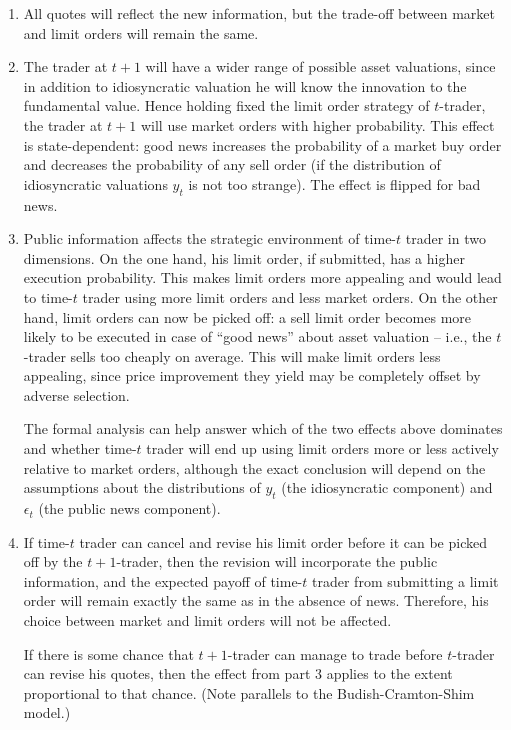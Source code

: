 \begin{solution}
	\begin{enumerate}
		\item All quotes will reflect the new information, but the trade-off between market and limit orders will remain the same.
		
		\item The trader at $t+1$ will have a wider range of possible asset valuations, since in addition to idiosyncratic valuation he will know the innovation to the fundamental value. Hence holding fixed the limit order strategy of $t$-trader, the trader at $t+1$ will use market orders with higher probability. This effect is state-dependent: good news increases the probability of a market buy order and decreases the probability of any sell order (if the distribution of idiosyncratic valuations $y_t$ is not too strange). The effect is flipped for bad news.
		
		\item Public information affects the strategic environment of time-$t$ trader in two dimensions. On the one hand, his limit order, if submitted, has a higher execution probability. This makes limit orders more appealing and would lead to time-$t$ trader using more limit orders and less market orders. On the other hand, limit orders can now be picked off: a sell limit order becomes more likely to be executed in case of ``good news'' about asset valuation -- i.e., the $t$-trader sells too cheaply on average. This will make limit orders less appealing, since price improvement they yield may be completely offset by adverse selection. 
		
		The formal analysis can help answer which of the two effects above dominates and whether  time-$t$ trader will end up using limit orders more or less actively relative to market orders, although the exact conclusion will depend on the assumptions about the distributions of $y_t$ (the idiosyncratic component) and $\epsilon_t$ (the public news component).
		
		\item If time-$t$ trader can cancel and revise his limit order before it can be picked off by the $t+1$-trader, then the revision will incorporate the public information, and the expected payoff of time-$t$ trader from submitting a limit order will remain exactly the same as in the absence of news. Therefore, his choice between market and limit orders will not be affected.
		
		If there is some chance that $t+1$-trader can manage to trade before $t$-trader can revise his quotes, then the effect from part 3 applies to the extent proportional to that chance. (Note parallels to the Budish-Cramton-Shim model.)
	\end{enumerate}
\end{solution}




